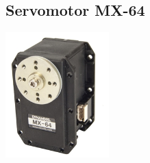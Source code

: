 \documentclass[a4paper]{book}
\begin{document}
 \subsection{Servomotor MX-64}

\begin{center}
\includegraphics[width=0.3\textwidth]{Figures/Hardware/Partes/MX-64.png}
\label{fig:Hardware:Partes:MX-64}
\end{center}
\end{document}
